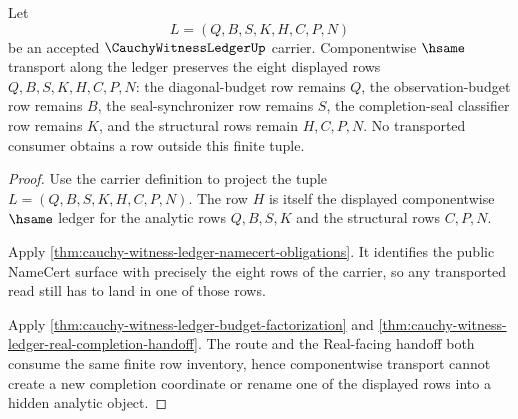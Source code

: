 \begin{theorem}
\label{thm:cauchy-witness-ledger-componentwise-transport}
Let
$$
L=(Q,B,S,K,H,C,P,N)
$$
be an accepted $\CauchyWitnessLedgerUp$ carrier. Componentwise $\hsame$ transport along the ledger preserves the eight displayed rows $Q,B,S,K,H,C,P,N$: the diagonal-budget row remains $Q$, the observation-budget row remains $B$, the seal-synchronizer row remains $S$, the completion-seal classifier row remains $K$, and the structural rows remain $H,C,P,N$. No transported consumer obtains a row outside this finite tuple.
\end{theorem}
\begin{proof}
Use the carrier definition to project the tuple $L=(Q,B,S,K,H,C,P,N)$. The row $H$ is itself the displayed componentwise $\hsame$ ledger for the analytic rows $Q,B,S,K$ and the structural rows $C,P,N$.

Apply \autoref{thm:cauchy-witness-ledger-namecert-obligations}. It identifies the public NameCert surface with precisely the eight rows of the carrier, so any transported read still has to land in one of those rows.

Apply \autoref{thm:cauchy-witness-ledger-budget-factorization} and \autoref{thm:cauchy-witness-ledger-real-completion-handoff}. The route and the Real-facing handoff both consume the same finite row inventory, hence componentwise transport cannot create a new completion coordinate or rename one of the displayed rows into a hidden analytic object.
\end{proof}

